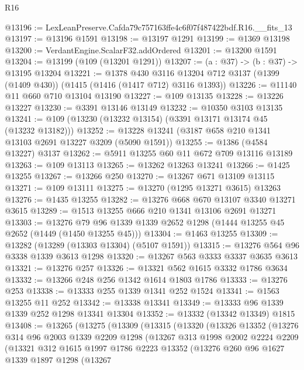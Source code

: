 \begin{lexlean}{R16}
\begin{coremodule}
@13196 := LexLeanPreserve.Cafda79c757163ffe4c6f07f487422bdf.R16.__fits_13
@13197 := @13196 @1591
@13198 := @13197 @1291
@13199 := @1369 @13198
@13200 := VerdantEngine.ScalarF32.addOrdered
@13201 := @13200 @1591
@13204 := @13199 (@109 (@13201 @1291))
@13207 := (a : @37) -> (b : @37) -> @13195 @13204
@13221 := @1378
    @430
    @3116
    @13204
    @712
    @3137
    (@1399 (@1409 @430))
    (@1415 (@1416 (@1417 @712) @3116 @1393))
@13226 := @11140 @11 @660 @710 @13104 @13190
@13227 := @109 @13135
@13228 := @13226 @13227
@13230 := @3391 @13146 @13149
@13232 := @10350 @3103 @13135
@13241 := @109 (@13230 (@13232 @13154) (@3391 @13171 @13174 @45 (@13232 @13182)))
@13252 := @13228 @13241 (@3187 @658 @210 @1341 @13103 @2691 @13227 @3209 (@5090 @1591))
@13255 := @1386 (@4584 @13227) @3137
@13262 := @5911 @13255 @60 @11 @672 @709 @13116 @13189
@13263 := @109 @13113
@13265 := @13262 @13263 @13241
@13266 := @1425 @13255
@13267 := @13266 @250
@13270 := @13267 @671 @13109 @13115
@13271 := @109 @13111
@13275 := @13270 (@1295 @13271 @3615) @13263
@13276 := @1435 @13255
@13282 := @13276 @668 @670 @13107 @3340 @13271 @3615
@13289 := @1513 @13255 @666 @210 @1341 @13106 @2691 @13271
@13303 := @13276 @79 @96 @1339 @1339 @2652 @1298 (@1444 @13255 @45 @2652 (@1449 (@1450 @13255 @45)))
@13304 := @1463 @13255
@13309 := @13282 (@13289 (@13303 @13304) (@5107 @1591))
@13315 := @13276 @564 @96 @3338 @1339 @3613 @1298
@13320 := @13267 @563 @3333 @3337 @3635 @3613
@13321 := @13276 @257
@13326 := @13321 @562 @1615 @3332 @1786 @3634
@13332 := @13266 @248 @256 @1342 @1614 @1803 @1786
@13333 := @13276 @253
@13338 := @13333 @255 @1339 @1341 @252 @1524
@13341 := @1563 @13255 @11 @252
@13342 := @13338 @13341
@13349 := @13333 @96 @1339 @1339 @252 @1298 @13341 @13304
@13352 := @13332 (@13342 @13349) @1815
@13408 := @13265
    (@13275
      (@13309
        (@13315
          (@13320
            (@13326
              @13352
              (@13276
                @314
                @96
                @2003
                @1339
                @2209
                @1298
                (@13267
                  @313
                  @1998
                  @2002
                  @2224
                  @2209
                  (@13321
                    @312
                    @1615
                    @1997
                    @1786
                    @2223
                    @13352
                    (@13276
                      @260
                      @96
                      @1627
                      @1339
                      @1897
                      @1298
                      (@13267

\end{coremodule}
\end{lexlean}
